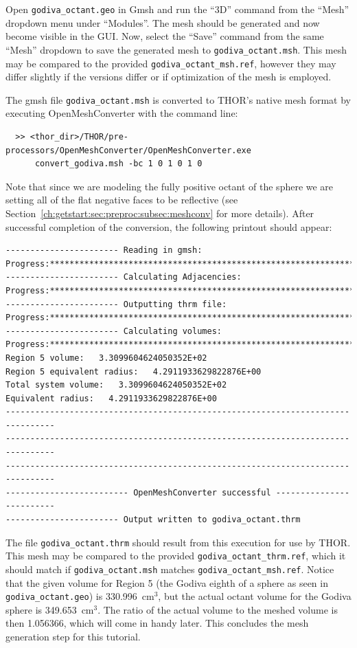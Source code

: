 Open \verb"godiva_octant.geo" in Gmsh and run the ``3D'' command from the ``Mesh'' dropdown menu under ``Modules''.
The mesh should be generated and now become visible in the \ac{GUI}.
Now, select the ``Save'' command from the same ``Mesh'' dropdown to save the generated mesh to \verb"godiva_octant.msh".
This mesh may be compared to the provided \verb"godiva_octant_msh.ref", however they may differ slightly if the versions differ or if optimization of the mesh is employed.

The gmsh file \verb"godiva_octant.msh" is converted to \ac{THOR}'s native mesh format by executing OpenMeshConverter with the command line:
\begin{verbatim}
  >> <thor_dir>/THOR/pre-processors/OpenMeshConverter/OpenMeshConverter.exe
      convert_godiva.msh -bc 1 0 1 0 1 0
\end{verbatim}
Note that since we are modeling the fully positive octant of the sphere we are setting all of the flat negative faces to be reflective (see Section~\ref{ch:getstart:sec:preproc:subsec:meshconv} for more details).
After successful completion of the conversion, the following printout should appear:
\begin{verbatim}
----------------------- Reading in gmsh:
Progress:***********************************************************************
----------------------- Calculating Adjacencies:
Progress:***********************************************************************
----------------------- Outputting thrm file:
Progress:***********************************************************************
----------------------- Calculating volumes:
Progress:***********************************************************************
Region 5 volume:   3.3099604624050352E+02
Region 5 equivalent radius:   4.2911933629822876E+00
Total system volume:   3.3099604624050352E+02
Equivalent radius:   4.2911933629822876E+00
--------------------------------------------------------------------------------
--------------------------------------------------------------------------------
--------------------------------------------------------------------------------
------------------------- OpenMeshConverter successful -------------------------
----------------------- Output written to godiva_octant.thrm
\end{verbatim}

The file \verb"godiva_octant.thrm" should result from this execution for use by THOR.
This mesh may be compared to the provided \verb"godiva_octant_thrm.ref", which it should match if \verb"godiva_octant.msh" matches \verb"godiva_octant_msh.ref".
Notice that the given volume for Region 5 (the Godiva eighth of a sphere as seen in \verb"godiva_octant.geo") is 330.996~cm$^3$, but the actual octant volume for the Godiva sphere is 349.653~cm$^3$.
The ratio of the actual volume to the meshed volume is then 1.056366, which will come in handy later.
This concludes the mesh generation step for this tutorial.

